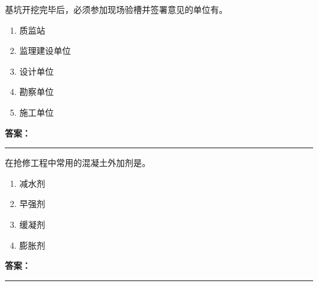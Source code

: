 \documentclass[UTF8,fontset=fandol,11pt]{ctexart}
\newcommand{\answerline}{\textcolor{answerred}{\rule{2.4cm}{0.7pt}}}
\begin{document}
\begin{quizbox}[title={乱序第 241 题｜第一章土方工程}]

基坑开挖完毕后，必须参加现场验槽并签署意见的单位有。\\

\begin{enumerate}[label=\Alph*.]

\item 质监站

\item 监理建设单位

\item 设计单位

\item 勘察单位

\item 施工单位

\end{enumerate}

\textbf{\textcolor{answerred}{答案：}} \answerline

\end{quizbox}

\vspace{0.2em}

\begin{quizbox}[title={乱序第 242 题｜第四章混凝土结构工程}]

在抢修工程中常用的混凝土外加剂是。\\

\begin{enumerate}[label=\Alph*.]

\item 减水剂

\item 早强剂

\item 缓凝剂

\item 膨胀剂

\end{enumerate}

\textbf{\textcolor{answerred}{答案：}} \answerline

\end{quizbox}

\vspace{0.2em}
\end{document}
